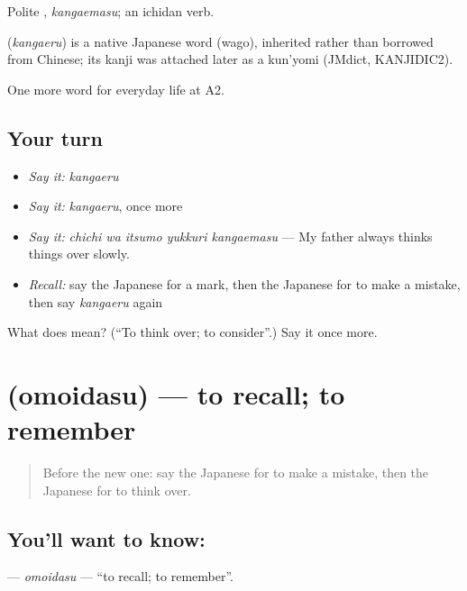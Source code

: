 Polite \textbf{}, \emph{kangaemasu}; an ichidan verb.

\begin{cousinweb}
\textbf{} (\emph{kangaeru}) is a native Japanese word (wago), inherited rather than borrowed from Chinese; its kanji was attached later as a kun'yomi (JMdict, KANJIDIC2).
\end{cousinweb}

\begin{grammarlens}[title={What you've built}]
One more word for everyday life at A2.
\end{grammarlens}

\subsection*{Your turn}
\begin{itemize}
\raggedright
  \item \emph{Say it:} \emph{kangaeru}
  \item \emph{Say it:} \emph{kangaeru}, once more
  \item \emph{Say it:} \emph{chichi wa itsumo yukkuri kangaemasu} — My father always thinks things over slowly.
  \item \emph{Recall:} say the Japanese for a mark, then the Japanese for to make a mistake, then say \emph{kangaeru} again
\end{itemize}

\begin{tcolorbox}[breakable,colback=teal!4,colframe=teal!35!black,title={Before you move on}]
What does  mean? (\textquotedblleft{}To think over; to consider\textquotedblright{}.) Say it once more.
\end{tcolorbox}
\section[\texorpdfstring{\ja{おもいだす} (omoidasu)}{おもいだす (omoidasu)}]{ (omoidasu) — to recall; to remember}

\label{lesson:JA-C227-omoidasu}



\begin{quote}
Before the new one: say the Japanese for to make a mistake, then the Japanese for to think over.
\end{quote}

\subsection*{You'll want to know: }
\textbf{} — \emph{omoidasu} — \textquotedblleft{}to recall; to remember\textquotedblright{}.

